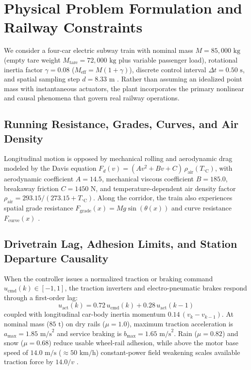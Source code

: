 \documentclass[10pt,a4paper]{article}
\begin{document}
\section{Physical Problem Formulation and Railway Constraints}

We consider a four-car electric subway train with nominal mass $M = 85,000\text{ kg}$ (empty tare weight $M_{\text{tare}} = 72,000\text{ kg}$ plus variable passenger load), rotational inertia factor $\gamma = 0.08$ ($M_{\text{eff}} = M(1 + \gamma)$), discrete control interval $\Delta t = 0.50\text{ s}$, and spatial sampling step $d = 8.33\text{ m}$ \cite{havaei2022,liu2025}. Rather than assuming an idealized point mass with instantaneous actuators, the plant incorporates the primary nonlinear and causal phenomena that govern real railway operations.

\subsection{Running Resistance, Grades, Curves, and Air Density}
Longitudinal motion is opposed by mechanical rolling and aerodynamic drag modeled by the Davis equation $F_d(v) = (A v^2 + B v + C)\,\rho_{\text{air}}(T_{^\circ\text{C}})$, with aerodynamic coefficient $A = 14.5$, mechanical viscous coefficient $B = 185.0$, breakaway friction $C = 1450\text{ N}$, and temperature-dependent air density factor $\rho_{\text{air}} = 293.15 / (273.15 + T_{^\circ\text{C}})$. Along the corridor, the train also experiences spatial grade resistance $F_{\text{grade}}(x) = M g \sin(\theta(x))$ and curve resistance $F_{\text{curve}}(x)$ \cite{havaei2022,liu2025}.

\subsection{Drivetrain Lag, Adhesion Limits, and Station Departure Causality}
When the controller issues a normalized traction or braking command $u_{\text{cmd}}(k) \in [-1, 1]$, the traction inverters and electro-pneumatic brakes respond through a first-order lag:
\begin{equation}
    u_{\text{act}}(k) = 0.72\, u_{\text{cmd}}(k) + 0.28\, u_{\text{act}}(k - 1)
    \label{eq:actuator_lag}
\end{equation}
coupled with longitudinal car-body inertia momentum $0.14\,(v_k - v_{k-1})$. At nominal mass ($85\text{ t}$) on dry rails ($\mu = 1.0$), maximum traction acceleration is $a_{\max} = 1.85\text{ m/s}^2$ and service braking is $b_{\max} = 1.65\text{ m/s}^2$. Rain ($\mu = 0.82$) and snow ($\mu = 0.68$) reduce usable wheel-rail adhesion, while above the motor base speed of $14.0\text{ m/s}$ ($\approx 50\text{ km/h}$) constant-power field weakening scales available traction force by $14.0 / v$ \cite{liu2025}.
\end{document}

